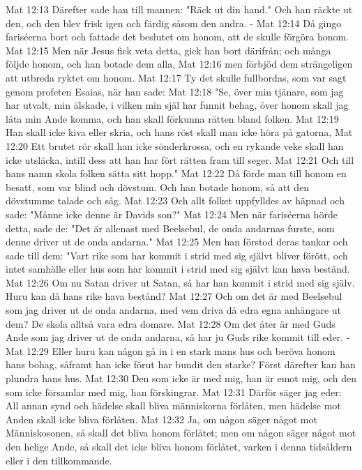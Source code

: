 Mat 12:13  Därefter sade han till mannen: "Räck ut din hand." Och han räckte ut den, och den blev frisk igen och färdig såsom den andra. -
Mat 12:14  Då gingo fariséerna bort och fattade det beslutet om honom, att de skulle förgöra honom.
Mat 12:15  Men när Jesus fick veta detta, gick han bort därifrån; och många följde honom, och han botade dem alla,
Mat 12:16  men förbjöd dem strängeligen att utbreda ryktet om honom.
Mat 12:17  Ty det skulle fullbordas, som var sagt genom profeten Esaias, när han sade:
Mat 12:18  "Se, över min tjänare, som jag har utvalt, min älskade, i vilken min själ har funnit behag, över honom skall jag låta min Ande komma, och han skall förkunna rätten bland folken.
Mat 12:19  Han skall icke kiva eller skria, och hans röst skall man icke höra på gatorna,
Mat 12:20  Ett brutet rör skall han icke sönderkrossa, och en rykande veke skall han icke utsläcka, intill dess att han har fört rätten fram till seger.
Mat 12:21  Och till hans namn skola folken sätta sitt hopp."
Mat 12:22  Då förde man till honom en besatt, som var blind och dövstum. Och han botade honom, så att den dövstumme talade och såg.
Mat 12:23  Och allt folket uppfylldes av häpnad och sade: "Månne icke denne är Davids son?"
Mat 12:24  Men när fariséerna hörde detta, sade de: "Det är allenast med Beelsebul, de onda andarnas furste, som denne driver ut de onda andarna."
Mat 12:25  Men han förstod deras tankar och sade till dem: "Vart rike som har kommit i strid med sig självt bliver förött, och intet samhälle eller hus som har kommit i strid med sig självt kan hava bestånd.
Mat 12:26  Om nu Satan driver ut Satan, så har han kommit i strid med sig själv. Huru kan då hans rike hava bestånd?
Mat 12:27  Och om det är med Beelsebul som jag driver ut de onda andarna, med vem driva då edra egna anhängare ut dem? De skola alltså vara edra domare.
Mat 12:28  Om det åter är med Guds Ande som jag driver ut de onda andarna, så har ju Guds rike kommit till eder. -
Mat 12:29  Eller huru kan någon gå in i en stark mans hus och beröva honom hans bohag, såframt han icke förut har bundit den starke? Först därefter kan han plundra hans hus.
Mat 12:30  Den som icke är med mig, han är emot mig, och den som icke församlar med mig, han förskingrar.
Mat 12:31  Därför säger jag eder: All annan synd och hädelse skall bliva människorna förlåten, men hädelse mot Anden skall icke bliva förlåten.
Mat 12:32  Ja, om någon säger något mot Människosonen, så skall det bliva honom förlåtet; men om någon säger något mot den helige Ande, så skall det icke bliva honom förlåtet, varken i denna tidsåldern eller i den tillkommande.
